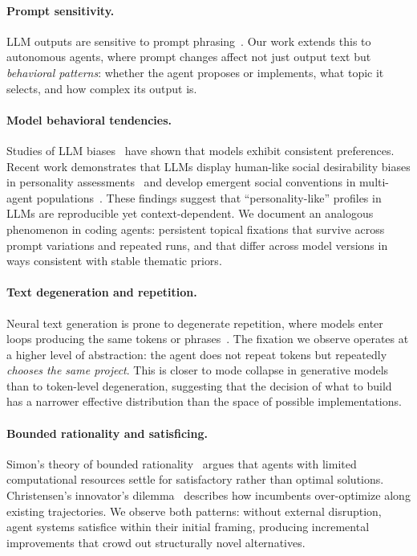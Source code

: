 \documentclass{article}
\begin{document}
\paragraph{Prompt sensitivity.}
LLM outputs are sensitive to prompt
phrasing~\citep{lu2022promptorder,zhao2021calibrate}. Our work
extends this to autonomous agents, where prompt changes affect
not just output text but \emph{behavioral patterns}: whether the
agent proposes or implements, what topic it selects, and how
complex its output is.

\paragraph{Model behavioral tendencies.}
Studies of LLM biases~\citep{santurkar2023opinions} have shown that
models exhibit consistent preferences. Recent work demonstrates
that LLMs display human-like social desirability biases in
personality assessments~\citep{simonds2025llmpersonality} and
develop emergent social conventions in multi-agent
populations~\citep{chuang2024emergent}. These findings suggest that
``personality-like'' profiles in LLMs are reproducible yet
context-dependent. We document an analogous phenomenon in coding
agents: persistent topical fixations that survive across prompt
variations and repeated runs, and that differ across model
versions in ways consistent with stable thematic priors.

\paragraph{Text degeneration and repetition.}
Neural text generation is prone to degenerate repetition, where
models enter loops producing the same tokens or
phrases~\citep{holtzman2020curious}. The fixation we observe
operates at a higher level of abstraction: the agent does not
repeat tokens but repeatedly \emph{chooses the same project}.
This is closer to mode collapse in generative models than to
token-level degeneration, suggesting that the decision of what to
build has a narrower effective distribution than the space of
possible implementations.

\paragraph{Bounded rationality and satisficing.}
Simon's theory of bounded rationality~\citep{simon1956} argues that
agents with limited computational resources settle for satisfactory
rather than optimal solutions. Christensen's innovator's
dilemma~\citep{christensen1997} describes how incumbents
over-optimize along existing trajectories. We observe both
patterns: without external disruption, agent systems satisfice
within their initial framing, producing incremental improvements
that crowd out structurally novel alternatives.
\end{document}
